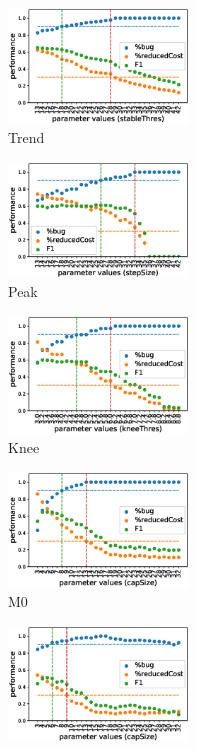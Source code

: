 \begin{figure}[t!]
  \centering
  \begin{subfigure}{0.24\textwidth}
    \includegraphics[width=4.8cm]{figure/threLearningTrend.eps}
	 \caption{Trend}
	 \label{fig:TLTrend}
  \end{subfigure}
  \begin{subfigure}{0.24\textwidth}
    \includegraphics[width=4.8cm]{figure/threLearningArrival.eps}
	\caption{Peak}
   \label{fig:TLArrival}
  \end{subfigure}
  \begin{subfigure}{0.24\textwidth}
    \includegraphics[width=4.8cm]{figure/threLearningKnee.eps}
	\caption{Knee}
    \label{fig:TLKnee}
  \end{subfigure}
   \begin{subfigure}{0.24\textwidth}
    \includegraphics[width=4.8cm]{figure/threLearningM0.eps}
	\caption{M0}
    \label{fig:TLM0}
  \end{subfigure}
   \begin{subfigure}{0.24\textwidth}
    \includegraphics[width=4.8cm]{figure/threLearningMth.eps}

\end{subfigure}
\end{figure}
